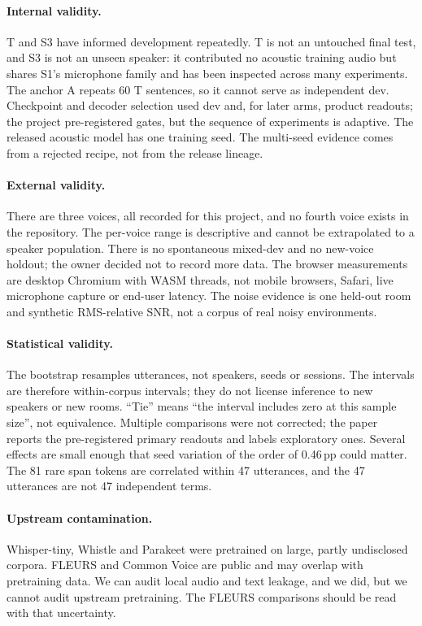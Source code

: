 \documentclass{article}
\begin{document}
\paragraph{Internal validity.}
T and S3 have informed development repeatedly. T is not an untouched final test, and S3 is not an
unseen speaker: it contributed no acoustic training audio but shares S1's microphone family and
has been inspected across many experiments. The anchor A repeats 60 T sentences, so it cannot
serve as independent dev. Checkpoint and decoder selection used dev and, for later arms, product
readouts; the project pre-registered gates, but the sequence of experiments is adaptive. The
released acoustic model has one training seed. The multi-seed evidence comes from a rejected
recipe, not from the release lineage.

\paragraph{External validity.}
There are three voices, all recorded for this project, and no fourth voice exists in the
repository. The per-voice range is descriptive and cannot be extrapolated to a speaker population.
There is no spontaneous mixed-dev and no new-voice holdout; the owner decided not to record more
data. The browser measurements are desktop Chromium with WASM threads, not mobile browsers,
Safari, live microphone capture or end-user latency. The noise evidence is one held-out room and
synthetic RMS-relative SNR, not a corpus of real noisy environments.

\paragraph{Statistical validity.}
The bootstrap resamples utterances, not speakers, seeds or sessions. The intervals are therefore
within-corpus intervals; they do not license inference to new speakers or new rooms. ``Tie''
means ``the interval includes zero at this sample size'', not equivalence. Multiple comparisons
were not corrected; the paper reports the pre-registered primary readouts and labels exploratory
ones. Several effects are small enough that seed variation of the order of 0.46\,pp could matter.
The 81 rare span tokens are correlated within 47 utterances, and the 47 utterances are not 47
independent terms.

\paragraph{Upstream contamination.}
Whisper-tiny, Whistle and Parakeet were pretrained on large, partly undisclosed corpora. FLEURS
and Common Voice are public and may overlap with pretraining data. We can audit local audio and
text leakage, and we did, but we cannot audit upstream pretraining. The FLEURS comparisons should
be read with that uncertainty.
\end{document}
